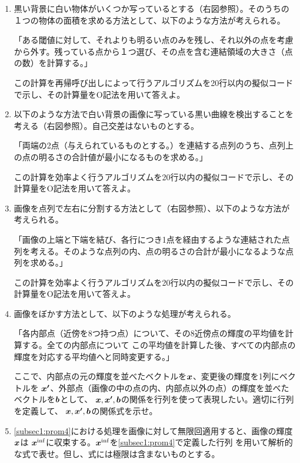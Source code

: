 \begin{enumerate}[(1)]
    \setlength{\itemsep}{10pt}
    \item 黒い背景に白い物体がいくつか写っているとする（右図参照）。そのうちの１つの物体の面積を求める方法として、以下のような方法が考えられる。\label{subsec1:prom1}
    
    「ある閾値に対して、それよりも明るい点のみを残し、それ以外の点を考慮から外す。残っている点から１つ選び、その点を含む連結領域の大きさ（点の数）を計算する。」

    この計算を再帰呼び出しによって行うアルゴリズムを20行以内の擬似コードで示し、その計算量をO記法を用いて答えよ。
    \item 以下のような方法で白い背景の画像に写っている黒い曲線を検出することを考える（右図参照）。自己交差はないものとする。\label{subsec1:prom2}
    
    「両端の2点（与えられているものとする。）を連結する点列のうち、点列上の点の明るさの合計値が最小になるものを求める。」

    この計算を効率よく行うアルゴリズムを20行以内の擬似コードで示し、その計算量をO記法を用いて答えよ。
    \item 画像を点列で左右に分割する方法として（右図参照）、以下のような方法が考えられる。\label{subsec1:prom3}
    
    「画像の上端と下端を結び、各行につき1点を経由するような連結された点列を考える。そのような点列の内、点の明るさの合計が最小になるような点列を求める。」

    この計算を効率よく行うアルゴリズムを20行以内の擬似コードで示し、その計算量をO記法を用いて答えよ。
    \item 画像をぼかす方法として、以下のような処理が考えられる。\label{subsec1:prom4}
    
    「各内部点（近傍を8つ持つ点）について、その8近傍点の輝度の平均値を計算する。全ての内部点について
    この平均値を計算した後、すべての内部点の輝度を対応する平均値へと同時変更する。」

    ここで、内部点の元の輝度を並べたベクトルを$\mbox{\boldmath $x$}$、変更後の輝度を1列にベクトルを
    $\mbox{\boldmath $x'$}$、外部点（画像の中の点の内、内部点以外の点）の輝度を並べたベクトルを$\mbox{\boldmath $b$}$として、
    $\mbox{\boldmath $x$},\mbox{\boldmath $x'$},\mbox{\boldmath $b$}$の関係を行列を使って表現したい。適切に行列を定義して、
    $\mbox{\boldmath $x$},\mbox{\boldmath $x'$},\mbox{\boldmath $b$}$の関係式を示せ。
    \item \eqref{subsec1:prom4}における処理を画像に対して無限回適用すると、画像の輝度$\mbox{\boldmath $x$}$は
    $\mbox{\boldmath $x$}^{\mathrm{inf}}$に収束する。$\mbox{\boldmath $x$}^{\mathrm{inf}}$を\eqref{subsec1:prom4}で定義した行列
    を用いて解析的な式で表せ。但し、式には極限は含まないものとする。
\end{enumerate}

